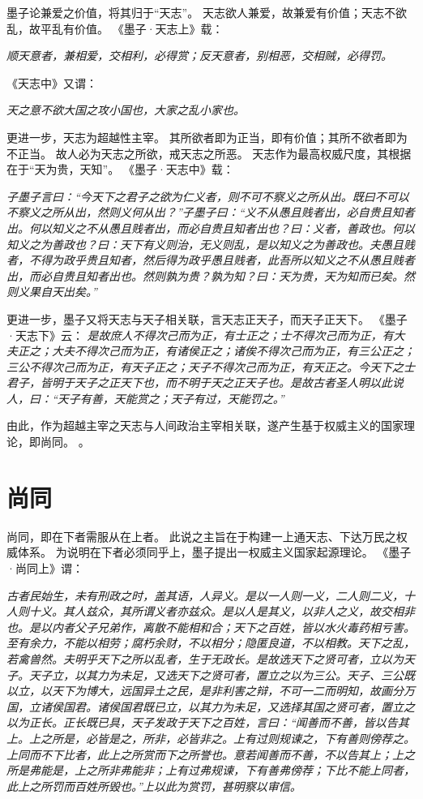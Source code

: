 \documentclass[11pt]{article}
\begin{document}
\newline

墨子论兼爱之价值，将其归于“天志”。
天志欲人兼爱，故兼爱有价值；天志不欲乱，故平乱有价值。
《墨子·天志上》载：

\textit{顺天意者，兼相爱，交相利，必得赏；反天意者，别相恶，交相贼，必得罚。}

《天志中》又谓：

\textit{天之意不欲大国之攻小国也，大家之乱小家也。}

\newline

更进一步，天志为超越性主宰。
其所欲者即为正当，即有价值；其所不欲者即为不正当。
故人必为天志之所欲，戒天志之所恶。
天志作为最高权威尺度，其根据在于“天为贵，天知”。
《墨子·天志中》载：

\textit{子墨子言曰：“今天下之君子之欲为仁义者，则不可不察义之所从出。既曰不可以不察义之所从出，然则义何从出？”子墨子曰：“义不从愚且贱者出，必自贵且知者出。何以知义之不从愚且贱者出，而必自贵且知者出也？曰：义者，善政也。何以知义之为善政也？曰：天下有义则治，无义则乱，是以知义之为善政也。夫愚且贱者，不得为政乎贵且知者，然后得为政乎愚且贱者，此吾所以知义之不从愚且贱者出，而必自贵且知者出也。然则孰为贵？孰为知？曰：天为贵，天为知而已矣。然则义果自天出矣。”}

\newline

更进一步，墨子又将天志与天子相关联，言天志正天子，而天子正天下。
《墨子·天志下》云：
\textit{是故庶人不得次己而为正，有士正之；士不得次己而为正，有大夫正之；大夫不得次己而为正，有诸侯正之；诸俟不得次己而为正，有三公正之；三公不得次己而为正，有天子正之；天子不得次己而为正，有天正之。今天下之士君子，皆明于天子之正天下也，而不明于天之正天子也。是故古者圣人明以此说人，曰：“天子有善，天能赏之；天子有过，天能罚之。”}

由此，作为超越主宰之天志与人间政治主宰相关联，遂产生基于权威主义的国家理论，即尚同。
。
\section{尚同}
尚同，即在下者需服从在上者。
此说之主旨在于构建一上通天志、下达万民之权威体系。
为说明在下者必须同乎上，墨子提出一权威主义国家起源理论。
《墨子·尚同上》谓：

\textit{古者民始生，未有刑政之时，盖其语，人异义。是以一人则一义，二人则二义，十人则十义。其人兹众，其所谓义者亦兹众。是以人是其义，以非人之义，故交相非也。是以内者父子兄弟作，离散不能相和合；天下之百姓，皆以水火毒药相亏害。至有余力，不能以相劳；腐朽余财，不以相分；隐匿良道，不以相教。天下之乱，若禽兽然。夫明乎天下之所以乱者，生于无政长。是故选天下之贤可者，立以为天子。天子立，以其力为未足，又选天下之贤可者，置立之以为三公。天子、三公既以立，以天下为博大，远国异土之民，是非利害之辩，不可一二而明知，故画分万国，立诸侯国君。诸侯国君既已立，以其力为未足，又选择其国之贤可者，置立之以为正长。正长既已具，天子发政于天下之百姓，言曰：“闻善而不善，皆以告其上。上之所是，必皆是之，所非，必皆非之。上有过则规谏之，下有善则傍荐之。上同而不下比者，此上之所赏而下之所誉也。意若闻善而不善，不以告其上；上之所是弗能是，上之所非弗能非；上有过弗规谏，下有善弗傍荐；下比不能上同者，此上之所罚而百姓所毁也。”上以此为赏罚，甚明察以审信。}
\end{document}

